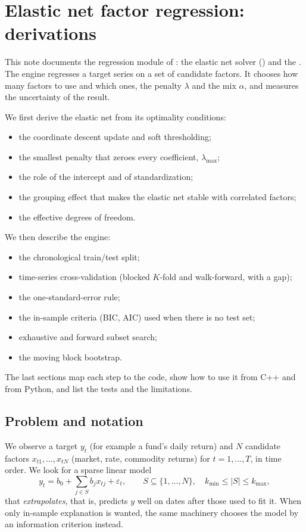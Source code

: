 \chapter{Elastic net factor regression: derivations}\label{ch:en}

This note documents the regression module of : the elastic net solver
() and the . The engine regresses a target series on a set of candidate factors.
It chooses how many factors to use and which ones, the penalty $\lambda$ and the mix
$\alpha$, and measures the uncertainty of the result.

We first derive the elastic net from its optimality conditions:
\begin{itemize}
  \item the coordinate descent update and soft thresholding;
  \item the smallest penalty that zeroes every coefficient, $\lambda_{\max}$;
  \item the role of the intercept and of standardization;
  \item the grouping effect that makes the elastic net stable with correlated factors;
  \item the effective degrees of freedom.
\end{itemize}
We then describe the engine:
\begin{itemize}
  \item the chronological train/test split;
  \item time-series cross-validation (blocked $K$-fold and walk-forward, with a gap);
  \item the one-standard-error rule;
  \item the in-sample criteria (BIC, AIC) used when there is no test set;
  \item exhaustive and forward subset search;
  \item the moving block bootstrap.
\end{itemize}
The last sections map each step to the code, show how to use it from C++ and from Python,
and list the tests and the limitations.




\section{Problem and notation}

We observe a target $y_t$ (for example a fund's daily return) and $N$ candidate factors
$x_{t1},\dots,x_{tN}$ (market, rate, commodity returns) for $t=1,\dots,T$, in time order.
We look for a sparse linear model
\[
  y_t = b_0 + \sum_{j\in S} b_j x_{tj} + \varepsilon_t,\qquad S\subseteq\{1,\dots,N\},\quad
  k_{\min}\le|S|\le k_{\max},
\]
that \emph{extrapolates}, that is, predicts $y$ well on dates after those used to fit it.
When only in-sample explanation is wanted, the same machinery chooses the model by an
information criterion instead.

